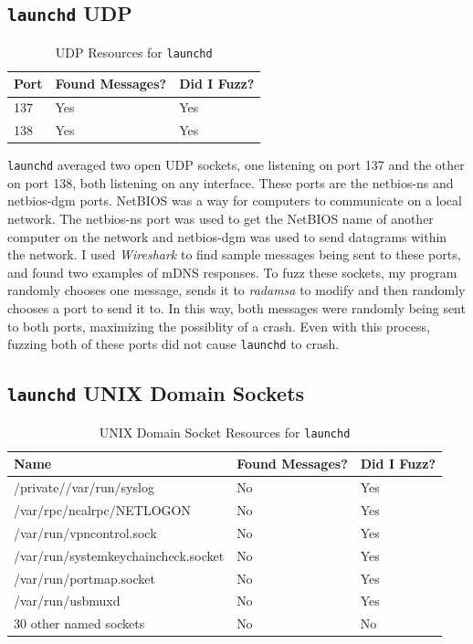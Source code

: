 \subsection{\texttt{launchd} UDP}
\label{sec:launchdUdp}

\begin{table}
\centering
\begin{normalsize}
\begin{tabular}{ l | l | l }
\textbf{Port} & \textbf{Found Messages?} & \textbf{Did I Fuzz?} \\ \hline
137 & Yes & Yes \\ \hline
138 & Yes & Yes \\ \hline
\end{tabular}
\caption{UDP Resources for \texttt{launchd}}
\label{tab:launchdUdpTab}
\end{normalsize}
\end{table} 

\texttt{launchd} averaged two open UDP sockets, one listening on port 137 and the other on port 138, both listening on any interface.  These ports are the netbios-ns and netbios-dgm ports.  NetBIOS was a way for computers to communicate on a local network.  The netbios-ns port was used to get the NetBIOS name of another computer on the network and netbios-dgm was used to send datagrams within the network.  I used \textit{Wireshark} to find sample messages being sent to these ports, and found two examples of mDNS responses.  To fuzz these sockets, my program randomly chooses one message, sends it to \textit{radamsa} to modify and then randomly chooses a port to send it to.  In this way, both messages were randomly being sent to both ports, maximizing the possiblity of a crash.  Even with this process, fuzzing both of these ports did not cause \texttt{launchd} to crash.

\subsection{\texttt{launchd} UNIX Domain Sockets}
\label{sec:launchdUnix}

\begin{table}
\centering
\begin{normalsize}
\begin{tabular}{ l | l | l }
\textbf{Name} & \textbf{Found Messages?} & \textbf{Did I Fuzz?} \\ \hline
/private//var/run/syslog & No & Yes \\ \hline
/var/rpc/ncalrpc/NETLOGON & No & Yes \\ \hline
/var/run/vpncontrol.sock & No & Yes \\ \hline
/var/run/systemkeychaincheck.socket & No & Yes \\ \hline
/var/run/portmap.socket & No & Yes \\ \hline
/var/run/usbmuxd & No & Yes \\ \hline
30 other named sockets & No & No \\ \hline
\end{tabular}
\caption{UNIX Domain Socket Resources for \texttt{launchd}}
\label{tab:launchdUnixTab}
\end{normalsize}
\end{table} 

